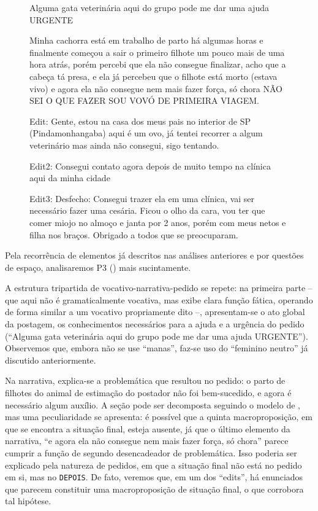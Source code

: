 \documentclass{textolivre}
\begin{document}
\begin{figure}[htbp]
\begin{minipage}{0.5\textwidth}
 Alguma gata veterinária aqui do grupo pode me dar uma ajuda URGENTE

Minha cachorra está em trabalho de parto há algumas horas e finalmente começou a sair o primeiro filhote um pouco mais de uma hora atrás, porém percebi que ela não consegue finalizar, acho que a cabeça tá presa, e ela já percebeu que o filhote está morto (estava vivo) e agora ela não consegue nem mais fazer força, só chora NÃO SEI O QUE FAZER SOU VOVÓ DE PRIMEIRA VIAGEM.

Edit: Gente, estou na casa dos meus pais no interior de SP (Pindamonhangaba) aqui é um ovo, já tentei recorrer a algum veterinário mas ainda não consegui, sigo tentando.

Edit2: Consegui contato agora depois de muito tempo na clínica aqui da minha cidade

Edit3: Desfecho: Consegui trazer ela em uma clínica, vai ser necessário fazer uma cesária. Ficou o olho da cara, vou ter que comer miojo no almoço e janta por 2 anos, porém com meus netos e filha nos braços. Obrigado a todos que se preocuparam.
\end{minipage}
\end{figure}

Pela recorrência de elementos já descritos nas análises anteriores e por questões de espaço, analisaremos P3 () mais sucintamente.

A estrutura tripartida de vocativo-narrativa-pedido se repete: na primeira parte – que aqui não é gramaticalmente vocativa, mas exibe clara função fática, operando de forma similar a um vocativo propriamente dito –, apresentam-se o ato global da postagem, os conhecimentos necessários para a ajuda e a urgência do pedido (“Alguma gata veterinária aqui do grupo pode me dar uma ajuda URGENTE”). Observemos que, embora não se use “manas”, faz-se uso do “feminino neutro” já discutido anteriormente.

Na narrativa, explica-se a problemática que resultou no pedido: o parto de filhotes do animal de estimação do postador não foi bem-sucedido, e agora é necessário algum auxílio. A seção pode ser decomposta seguindo o modelo de \textcite{adam1992}, mas uma peculiaridade se apresenta: é possível que a quinta macroproposição, em que se encontra a situação final, esteja ausente, já que o último elemento da narrativa, “e agora ela não consegue nem mais fazer força, só chora” parece cumprir a função de segundo desencadeador de problemática. Isso poderia ser explicado pela natureza de pedidos, em que a situação final não está no pedido em si, mas no \texttt{DEPOIS}. De fato, veremos que, em um dos “edits”, há enunciados que parecem constituir uma macroproposição de situação final, o que corrobora tal hipótese.
\end{document}
